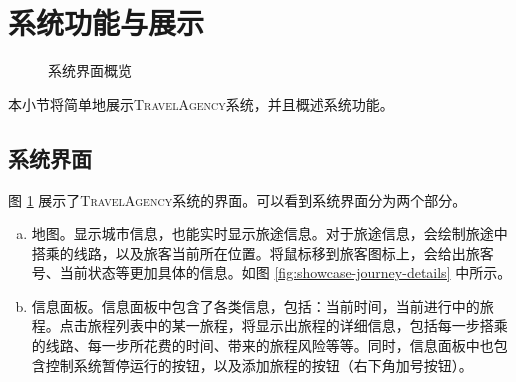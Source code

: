 \section{系统功能与展示}
\label{sec:showcase}

\begin{figure}[t]
	\centering
	\caption{系统界面概览}
	\label{fig:showcase}
\end{figure}

本小节将简单地展示\textsc{TravelAgency}系统，并且概述系统功能。

\subsection{系统界面}

图 \ref{fig:showcase} 展示了\textsc{TravelAgency}系统的界面。可以看到系统界面分为两个部分。

\begin{enumerate}[(a)]
  \item 地图。显示城市信息，也能实时显示旅途信息。对于旅途信息，会绘制旅途中搭乘的线路，以及旅客当前所在位置。将鼠标移到旅客图标上，会给出旅客号、当前状态等更加具体的信息。如图 \ref{fig:showcase-journey-details} 中所示。
  \item 信息面板。信息面板中包含了各类信息，包括：当前时间，当前进行中的旅程。点击旅程列表中的某一旅程，将显示出旅程的详细信息，包括每一步搭乘的线路、每一步所花费的时间、带来的旅程风险等等。同时，信息面板中也包含控制系统暂停运行的按钮，以及添加旅程的按钮（右下角加号按钮）。
\end{enumerate}

